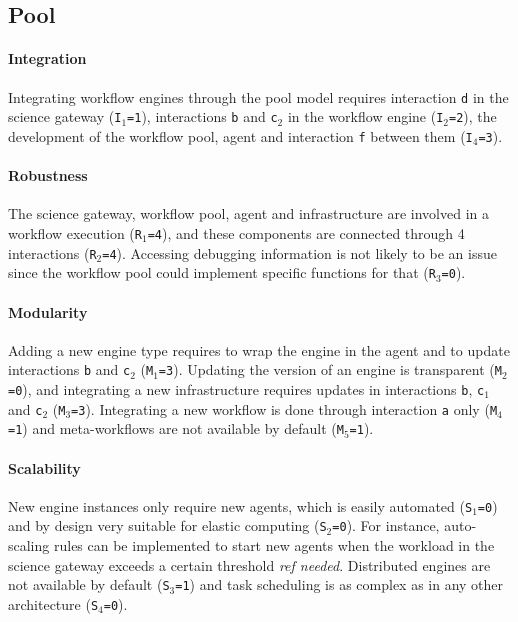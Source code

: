 \documentclass[preprint,3p,twocolumn]{elsarticle}
\newcommand{\todo}[1]{\color{blue}\xspace\emph{#1}\xspace\color{black}}
\begin{document}
\subsection{Pool}

\paragraph{Integration} Integrating workflow engines through the pool
model requires interaction \texttt{d} in the science gateway
(\texttt{I$_1$=1}), interactions \texttt{b} and \texttt{c$_2$} in the
workflow engine (\texttt{I$_2$=2}), the development of the workflow
pool, agent and interaction \texttt{f} between them
(\texttt{I$_4$=3}).

\paragraph{Robustness} The science gateway, workflow pool, agent and
infrastructure are involved in a workflow execution
(\texttt{R$_1$=4}), and these components are connected through 4
interactions (\texttt{R$_2$=4}). Accessing debugging information is
not likely to be an issue since the workflow pool could implement
specific functions for that (\texttt{R$_3$=0}). 

\paragraph{Modularity} Adding a new engine type requires to wrap the
engine in the agent and to update interactions \texttt{b} and
\texttt{c$_2$} (\texttt{M$_1$=3}). Updating the version of an engine
is transparent (\texttt{M$_2$=0}), and integrating a new
infrastructure requires updates in interactions \texttt{b},
\texttt{c$_1$} and \texttt{c$_2$} (\texttt{M$_3$=3}). Integrating a
new workflow is done through interaction \texttt{a} only
(\texttt{M$_4$=1}) and meta-workflows are not available by default
(\texttt{M$_5$=1}).

\paragraph{Scalability} New engine instances only require new agents,
which is easily automated (\texttt{S$_1$=0}) and by design very
suitable for elastic computing (\texttt{S$_2$=0}). For instance,
auto-scaling rules can be implemented to start new agents when the
workload in the science gateway exceeds a certain threshold \todo{ref
  needed}. Distributed engines are not available by default
(\texttt{S$_3$=1}) and task scheduling is as complex as in any other
architecture (\texttt{S$_4$=0}).
\end{document}
